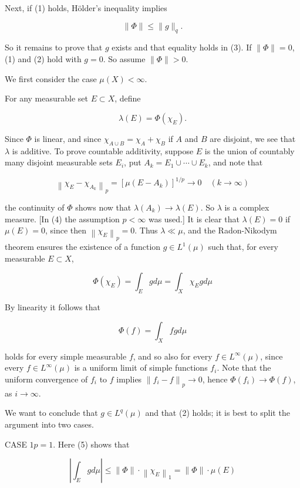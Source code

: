 \documentclass[10pt]{article}
\begin{document}
Next, if (1) holds, Hölder's inequality implies

$$
\|\Phi\| \leq\|g\|_{q} .
$$

So it remains to prove that $g$ exists and that equality holds in (3). If $\|\Phi\|=0$, (1) and (2) hold with $g=0$. So assume $\|\Phi\|>0$.

We first consider the case $\mu(X)<\infty$.

For any measurable set $E \subset X$, define

$$
\lambda(E)=\Phi\left(\chi_{E}\right) .
$$

Since $\Phi$ is linear, and since $\chi_{A \cup B}=\chi_{A}+\chi_{B}$ if $A$ and $B$ are disjoint, we see that $\lambda$ is additive. To prove countable additivity, suppose $E$ is the union of countably many disjoint measurable sets $E_{i}$, put $A_{k}=E_{1} \cup \cdots \cup E_{k}$, and note that

$$
\left\|\chi_{E}-\chi_{A_{k}}\right\|_{p}=\left[\mu\left(E-A_{k}\right)\right]^{1 / p} \rightarrow 0 \quad(k \rightarrow \infty)
$$

the continuity of $\Phi$ shows now that $\lambda\left(A_{k}\right) \rightarrow \lambda(E)$. So $\lambda$ is a complex measure. [In (4) the assumption $p<\infty$ was used.] It is clear that $\lambda(E)=0$ if $\mu(E)=0$,
since then $\left\|\chi_{E}\right\|_{p}=0$. Thus $\lambda \ll \mu$, and the Radon-Nikodym theorem ensures the existence of a function $g \in L^{1}(\mu)$ such that, for every measurable $E \subset X$,

$$
\Phi\left(\chi_{E}\right)=\int_{E} g d \mu=\int_{X} \chi_{E} g d \mu
$$

By linearity it follows that

$$
\Phi(f)=\int_{X} f g d \mu
$$

holds for every simple measurable $f$, and so also for every $f \in L^{\infty}(\mu)$, since every $f \in L^{\infty}(\mu)$ is a uniform limit of simple functions $f_{i}$. Note that the uniform convergence of $f_{i}$ to $f$ implies $\left\|f_{i}-f\right\|_{p} \rightarrow 0$, hence $\Phi\left(f_{i}\right) \rightarrow \Phi(f)$, as $i \rightarrow \infty$.

We want to conclude that $g \in L^{q}(\mu)$ and that (2) holds; it is best to split the argument into two cases.

CASE $1 p=1$. Here (5) shows that

$$
\left|\int_{E} g d \mu\right| \leq\|\Phi\| \cdot\left\|\chi_{E}\right\|_{1}=\|\Phi\| \cdot \mu(E)
$$
\end{document}
